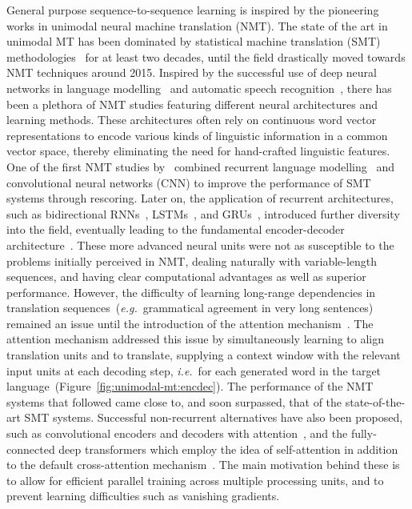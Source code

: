 \documentclass{svjour3}
\newcommand{\ie}[1]{\textit{i.e.}~#1}
\newcommand{\eg}[1]{\textit{e.g.}~#1}
\begin{document}
General purpose sequence-to-sequence learning is inspired by the pioneering works in unimodal neural machine translation (NMT). The state of the art in unimodal MT has been dominated by statistical machine translation (SMT) methodologies~\citep{koehn-smt-2009} for at least two decades, until the field drastically moved towards NMT techniques around 2015. Inspired by the successful use of deep neural networks in language modelling~\citep{bengio-nplm-2003,mikolov-rnnlm-2010} and automatic speech recognition~\citep{graves-speech-2013}, there has been a plethora of NMT studies featuring different neural architectures and learning methods. These architectures
often rely on continuous word vector representations to encode various kinds of linguistic information in a common vector space, thereby eliminating the need for
hand-crafted linguistic features.
One of the first NMT studies by~\citet{kalchbrenner-recurrent-2013} combined recurrent language modelling~\citep{mikolov-rnnlm-2010} and convolutional neural networks (CNN) to
improve the performance of SMT systems through rescoring.
Later on, the application of recurrent architectures, such as bidirectional RNNs~\citep{schuster-bidirectional-1997}, LSTMs~\citep{hochreiter-long-1997, graves-framewise-2005}, and GRUs~\citep{chung-empirical-2014}, introduced further diversity into the field, eventually leading to the fundamental encoder-decoder architecture~\citep{cho-properties-2014,sutskever-sequence-2014}.
These more advanced neural units were not as susceptible to the problems initially perceived in NMT, dealing naturally with variable-length sequences, and having clear computational advantages as well as superior performance. However, the difficulty of learning long-range dependencies in translation sequences~(\eg{grammatical agreement in very long sentences})
remained an issue until the introduction of the attention mechanism~\citep{bahdanau-neural-2015}. The attention mechanism addressed this issue by simultaneously learning to align translation units and to translate, supplying a context window with the relevant input units at each decoding step, \ie{}for each generated word in the target language~(Figure~\ref{fig:unimodal-mt:encdec}).
The performance of the NMT systems that followed came close to, and soon surpassed, that of the state-of-the-art SMT systems. Successful non-recurrent alternatives have also been proposed, such as convolutional encoders and decoders with attention~\citep{gehring-convolutional-2017}, and the fully-connected deep transformers which employ the idea of self-attention in addition to the default cross-attention mechanism~\citep{vaswani-attention-2017}. The main motivation behind these is to allow for efficient parallel training across multiple processing units, and to prevent learning difficulties such as vanishing gradients. 
\end{document}
